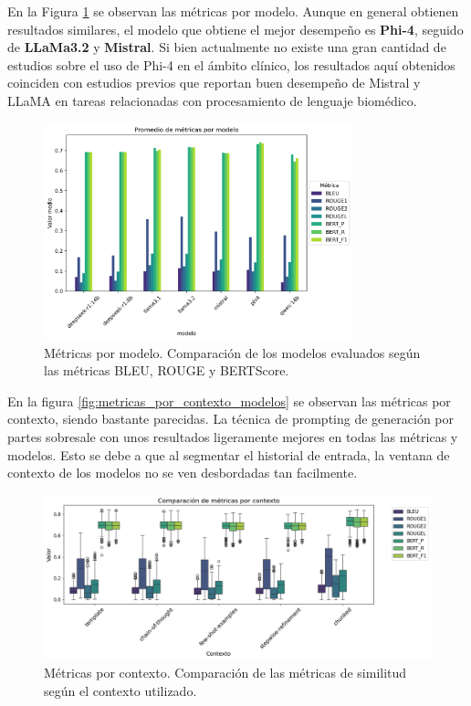 \documentclass[../main.tex]{subfiles}
\begin{document}
En la Figura \ref{fig:metricas_por_modelo} se observan las métricas por modelo. Aunque en general obtienen resultados similares, el modelo que obtiene el mejor desempeño es \textbf{Phi-4}, seguido de \textbf{LLaMa3.2} y \textbf{Mistral}. 
Si bien actualmente no existe una gran cantidad de estudios sobre el uso de Phi-4 en el ámbito clínico, los resultados aquí obtenidos coinciden con estudios previos que reportan buen desempeño de Mistral \parencite{zhang2024mistral} y LLaMA \parencite{ji2024llama3deepseek} en tareas relacionadas con procesamiento de lenguaje biomédico.

\begin{figure}[H]
    \centering
    \includegraphics[width=0.8\textwidth]{images/metricas_por_modelo.png}
    \caption{Métricas por modelo. Comparación de los modelos evaluados según las métricas BLEU, ROUGE y BERTScore.}
    \label{fig:metricas_por_modelo}
\end{figure}

En la figura \ref{fig:metricas_por_contexto_modelos} se observan las métricas por contexto, siendo bastante parecidas. La técnica de prompting de generación por partes sobresale con unos resultados ligeramente mejores en todas las métricas y modelos. Esto se debe a que al segmentar el historial de entrada, la ventana de contexto de los modelos no se ven desbordadas tan facilmente.

\begin{figure}[H]
    \centering
    \includegraphics[width=.8\textwidth]{images/metricas_por_contexto.png}
    \caption{Métricas por contexto. Comparación de las métricas de similitud según el contexto utilizado.}
    \label{fig:metricas_por_contexto}
\end{figure}
\end{document}
